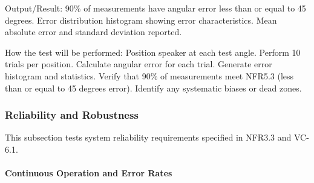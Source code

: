 \documentclass[12pt, titlepage]{article}
\begin{document}
\begin{enumerate}
Output/Result: 90\% of measurements have angular error less than or equal to 45 degrees. Error distribution
histogram showing error characteristics. Mean absolute error and standard
deviation reported.

How the test will be performed: Position speaker at each test angle. Perform 10
trials per position. Calculate angular error for each trial. Generate error
histogram and statistics. Verify that 90\% of measurements meet NFR5.3 (less than or equal to 45 degrees
error). Identify any systematic biases or dead zones.

\end{enumerate}

\subsubsection{Reliability and Robustness}

This subsection tests system reliability requirements specified in NFR3.3 and
VC-6.1.

\paragraph{Continuous Operation and Error Rates}
\end{document}
